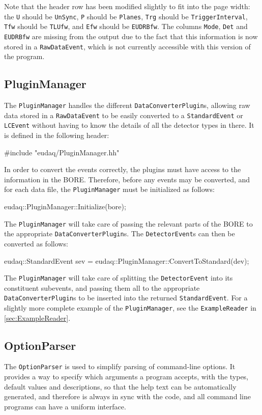 Note that the header row has been modified slightly to fit into the page width:
the \texttt{U} should be \texttt{UnSync}, \texttt{P} should be \texttt{Planes},
\texttt{Trg} should be \texttt{TriggerInterval}, \texttt{Tfw} should be \texttt{TLUfw},
and \texttt{Efw} should be \texttt{EUDRBfw}.
The columns \texttt{Mode}, \texttt{Det} and \texttt{EUDRBfw} are missing from the output
due to the fact that this information is now stored in a \texttt{RawDataEvent},
which is not currently accessible with this version of the program.


\subsection{PluginManager}\label{sec:PluginManager}
The \texttt{PluginManager} handles the different \texttt{DataConverterPlugin}s,
allowing raw data stored in a \texttt{RawDataEvent} to be easily converted
to a \texttt{StandardEvent} or \texttt{LCEvent} without having to know the details of all the detector types in there.
It is defined in the following header:
\begin{listing}
#include "eudaq/PluginManager.hh"
\end{listing}

In order to convert the events correctly,
the plugins must have access to the information in the BORE.
Therefore, before any events may be converted, and for each data file,
the \texttt{PluginManager} must be initialized as follows:
\begin{listing}
eudaq::PluginManager::Initialize(bore);
\end{listing}

The \texttt{PluginManager} will take care of passing the relevant parts of the \gls{BORE}
to the appropriate \texttt{DataConverterPlugin}s.
The \texttt{DetectorEvent}s can then be converted as follows:
\begin{listing}
eudaq::StandardEvent sev = eudaq::PluginManager::ConvertToStandard(dev);
\end{listing}

The \texttt{PluginManager} will take care of splitting the \texttt{DetectorEvent}
into its constituent subevents, and passing them all to the appropriate
\texttt{DataConverterPlugin}s to be inserted into the returned \texttt{StandardEvent}.
For a slightly more complete example of the \texttt{PluginManager},
see the \texttt{ExampleReader} in \autoref{sec:ExampleReader}.

\subsection{OptionParser}
The \texttt{OptionParser} is used to simplify parsing of command-line options.
It provides a way to specify which arguments a program accepts,
with the types, default values and descriptions,
so that the help text can be automatically generated,
and therefore is always in sync with the code,
and all command line programs can have a uniform interface.

